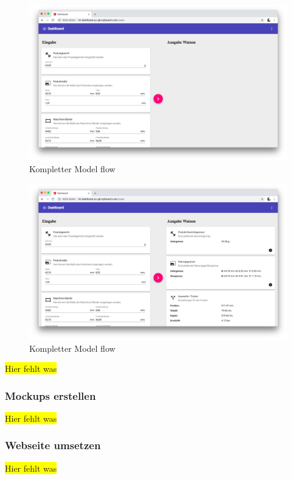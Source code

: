 \begin{figure}[h]
    \centering
    \includegraphics[width=\textwidth]{images/kapitel_4/website_input.png}
    \caption{Kompletter Model flow}
    \label{fig:umsetzung_website_input}
\end{figure}

\begin{figure}[h]
    \centering
    \includegraphics[width=\textwidth]{images/kapitel_4/website_output.png}
    \caption{Kompletter Model flow}
    \label{fig:umsetzung_website_output}
\end{figure}

\colorbox{yellow}{Hier fehlt was}

\subsubsection{Mockups erstellen}
\colorbox{yellow}{Hier fehlt was}

\subsubsection{Webseite umsetzen}
\colorbox{yellow}{Hier fehlt was}

